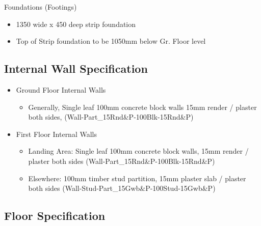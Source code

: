 Foundations (Footings)

\begin{itemize}
	\item 1350 wide x 450 deep strip foundation
	\item Top of Strip foundation to be 1050mm below Gr. Floor level
\end{itemize}



\subsection*{Internal Wall Specification}

\begin{itemize}
	\item Ground Floor Internal Walls
		\begin{itemize}
			\item Generally, Single leaf 100mm concrete block walls 15mm render / plaster both sides, (Wall-Part\_15Rnd\&P-100Blk-15Rnd\&P)
		\end{itemize}
	\item First Floor Internal Walls
		\begin{itemize}
			\item Landing Area: Single leaf 100mm concrete block walls, 15mm render / plaster both sides (Wall-Part\_15Rnd\&P-100Blk-15Rnd\&P)
			\item Elsewhere: 100mm timber stud partition, 15mm plaster slab / plaster both sides (Wall-Stud-Part\_15Gwb\&P-100Stud-15Gwb\&P) 
		\end{itemize} 
\end{itemize}



\subsection*{Floor Specification}


